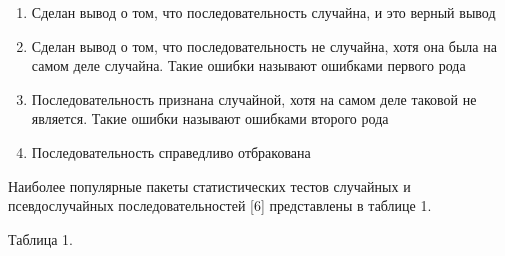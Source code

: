 \begin{enumerate}
\def\labelenumi{\arabic{enumi}.}
\item
  Сделан вывод о том, что последовательность случайна, и это верный
  вывод
\item
  Сделан вывод о том, что последовательность не случайна, хотя она была
  на самом деле случайна. Такие ошибки называют ошибками первого рода
\item
  Последовательность признана случайной, хотя на самом деле таковой не
  является. Такие ошибки называют ошибками второго рода
\item
  Последовательность справедливо отбракована
\end{enumerate}

Наиболее популярные пакеты статистических тестов случайных и
псевдослучайных последовательностей {[}6{]} представлены в таблице 1.

Таблица 1.

